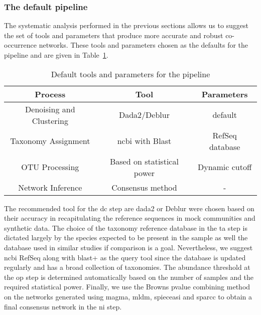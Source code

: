   \FloatBarrier

  \subsubsection*{The default pipeline}

  The systematic analysis performed in the previous sections allows us to suggest the set of tools and parameters that produce more accurate and robust co-occurrence networks.
  These tools and parameters chosen as the defaults for the pipeline and are given in Table~\ref{tab:default_options}.

  \begin{table}[h]
    \centering
    \small
    \begin{tabular}{|c|c|c|}
      \hline
      \textbf{Process} & \textbf{Tool} & \textbf{Parameters} \\
      \hline
      Denoising and Clustering & Dada2/Deblur & default \\
      Taxonomy Assignment & \ac{ncbi} with Blast & RefSeq database \\
      OTU Processing & Based on statistical power & Dynamic cutoff \\
      Network Inference & Consensus method & - \\
      \hline
    \end{tabular}
    \caption{Default tools and parameters for the pipeline}
    \label{tab:default_options}
  \end{table}

  The recommended tool for the \ac{dc} step are \ac{dada2} or Deblur were chosen based on their accuracy in recapitulating the reference sequences in mock communities and synthetic data.
  The choice of the taxonomy reference database in the \ac{ta} step is dictated largely by the species expected to be present in the sample as well the database used in similar studies if comparison is a goal.
  Nevertheless, we suggest \ac{ncbi} RefSeq along with blast+ as the query tool since the database is updated regularly and has a broad collection of taxonomies.
  The abundance threshold at the \ac{op} step is determined automatically based on the number of samples and the required statistical power.
  Finally, we use the Browns pvalue combining method on the networks generated using \ac{magma}, \ac{mldm}, \ac{spieceasi} and \ac{sparcc} to obtain a final consensus network in the \ac{ni} step.

